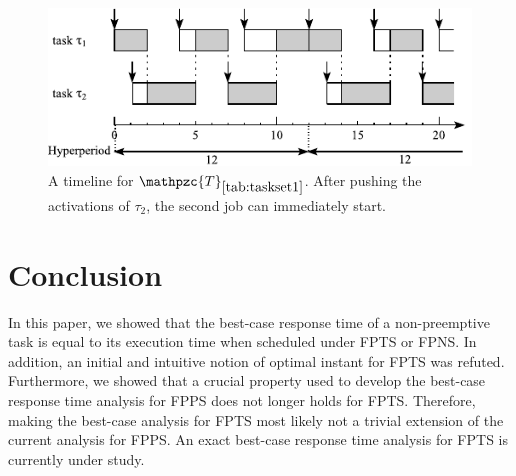 \documentclass[conference,compsoc]{IEEEtran}
\begin{document}
\begin{figure}[h]
	\centering
	\includegraphics[width=1\linewidth]{fig/fpns2}
	\caption{A timeline for $\mathpzc{T}_{\ref{tab:taskset1}}$. After pushing the activations of $\tau_2$, the second job can immediately start.}
	\label{fig:fpns2}
\end{figure}

\section{Conclusion}
In this paper, we showed that the best-case response time of a non-preemptive task is equal to its execution time when scheduled under FPTS or FPNS. In addition, an initial and intuitive notion of optimal instant for FPTS was refuted. Furthermore, we showed that a crucial property used to develop the best-case response time analysis for FPPS does not longer holds for FPTS. Therefore, making the best-case analysis for FPTS most likely not a trivial extension of the current analysis for FPPS. An exact best-case response time analysis for FPTS is currently under study.


%
%
%
%



\end{document}
